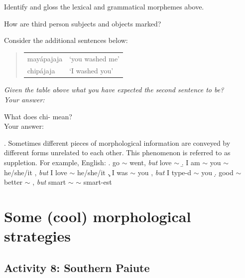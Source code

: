 \documentclass[11pt, oneside]{article}   	%
\begin{document}
\begin{enumerate}
{\itshape
\item Identify and gloss the lexical and grammatical morphemes above.
\item How are third person subjects and objects marked?
\item Consider the additional sentences below:}
		\begin{quote}
		\begin{tabular}{l l}
		mayápajaja & `you washed me' \\
		chipájaja & `I washed you' \\
		\end{tabular}
		\end{quote}
{\itshape Given the table above what you have expected the second sentence to be? \\
Your answer: 
\vspace{1cm}
\item What does {\normalfont chi-} mean? \\
Your answer:} \vspace{1cm}

\end{enumerate}

\ex. Sometimes different pieces of morphological information are conveyed by different forms unrelated to each other. This phenomenon is referred to as suppletion. For example, English:
	\a. go $\sim$ went, {\itshape but} love $\sim$ \underline{\hspace{1cm}}
	\b. I am $\sim$ you \underline{\hspace{1cm}} $\sim$ he/she/it \underline{\hspace{1cm}}, {\itshape but} I love $\sim$ he/she/it \underline{\hspace{1cm}}
	\c. I was $\sim$ you \underline{\hspace{1cm}}, {\itshape but} I type-d $\sim$ you \underline{\hspace{1cm}}
	\d. good $\sim$ better $\sim$ \underline{\hspace{1cm}}, {\itshape but} smart $\sim$ \underline{\hspace{1cm}} $\sim$ smart-est
	
\newpage
	
\section{Some (cool) morphological strategies}\label{strategies}

\subsection{Activity 8: Southern Paiute}
\end{document}
